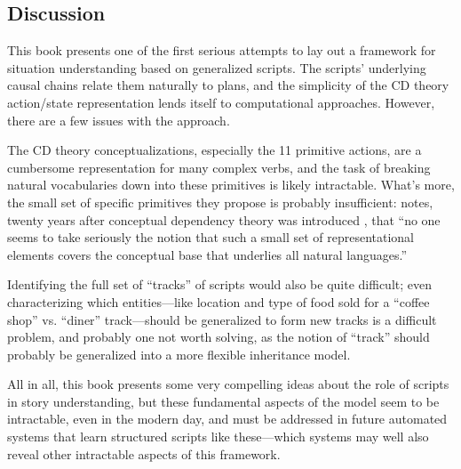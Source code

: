 \subsection{Discussion}
This book presents one of the first serious attempts to lay out a framework for situation understanding based on generalized scripts. The scripts' underlying causal chains relate them naturally to plans, and the simplicity of the CD theory action/state representation lends itself to computational approaches. However, there are a few issues with the approach.

The CD theory conceptualizations, especially the 11 primitive actions, are a cumbersome representation for many complex verbs, and the task of breaking natural vocabularies down into these primitives is likely intractable. What's more, the small set of specific primitives they propose is probably insufficient: \citet{lytinen1992conceptual} notes, twenty years after conceptual dependency theory was introduced \citep{schank1969conceptual}, that ``no one seems to take seriously the notion that such a small set of representational elements covers the conceptual base that underlies all natural languages.''

Identifying the full set of ``tracks'' of scripts would also be quite difficult; even characterizing which entities---like location and type of food sold for a ``coffee shop'' vs. ``diner'' track---should be generalized to form new tracks is a difficult problem, and probably one not worth solving, as the notion of ``track'' should probably be generalized into a more flexible inheritance model.

All in all, this book presents some very compelling ideas about the role of scripts in story understanding, but these fundamental aspects of the model seem to be intractable, even in the modern day, and must be addressed in future automated systems that learn structured scripts like these---which systems may well also reveal other intractable aspects of this framework.





